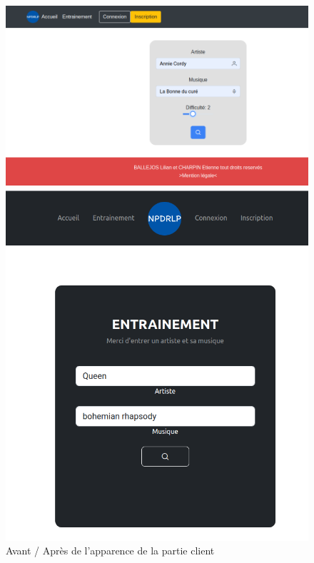 \documentclass[12pt,french]{article}
\begin{document}
\begin{figure}[H]
	\centering
	\begin{minipage}{.5\textwidth}
		\centering
		\includegraphics[scale=0.25]{avantfront.png}
	\end{minipage}%
	\begin{minipage}{.5\textwidth}
		\centering
		\includegraphics[scale=0.25]{apresfront.png}
	\end{minipage}
	\caption{Avant / Après de l'apparence de la partie client}
\end{figure}
\end{document}
